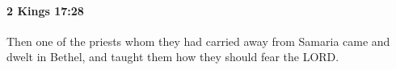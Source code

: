 
		\paragraph{2 Kings 17:28} %
			\label{2KINGS-17-28}

			Then one of the priests whom they had carried away from Samaria came and dwelt in Bethel, and taught them how they should fear the LORD.


